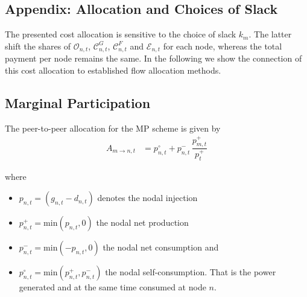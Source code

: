 \documentclass[11pt]{article}
\newcommand{\generation}[1][n]{g_{#1,s,t}}
\newcommand{\generationshare}[1][n]{\omega_{#1,s,t}}
\newcommand{\generationnodal}[1][n]{g_{#1,t}}
\newcommand{\demand}[1][n]{d_{#1,a,t}}
\newcommand{\demandnodal}[1][n]{d_{#1,t}}
\newcommand{\demandshare}[1][n]{\omega_{#1,a,t}}
\newcommand{\slack}[1][n]{k_{#1}}
\newcommand{\injection}{p_{n,t}}
\newcommand{\netconsumption}[1][n]{p^{-}_{#1,t}}
\newcommand{\netproduction}[1][n]{p^{+}_{#1,t}}
\newcommand{\selfconsumption}[1][n]{p^{\circ}_{#1,t}}
\newcommand{\totalnetproduction}{p^{+}_{t}}
\newcommand{\allocatePeer}[1][m \rightarrow n]{A_{#1,t}}
\newcommand{\allocateCapexGeneration}[1][n]{\mathcal{C}^{G}_{#1,t}}
\newcommand{\allocateCapexFlow}[1][n]{\mathcal{C}^{F}_{#1,t}}
\newcommand{\allocateOpex}[1][n]{\mathcal{O}_{#1,t}}
\newcommand{\allocateEmissionCost}[1][n]{\mathcal{E}_{#1,t}}
\begin{document}
% 
% 

\newpage
\subsection*{Appendix: Allocation and Choices of Slack}

The presented cost allocation is sensitive to the choice of slack $\slack[m]$. The latter shift the shares of $\allocateOpex$, $\allocateCapexGeneration$, $\allocateCapexFlow$ and $\allocateEmissionCost$ for each node, whereas the total payment per node remains the same. In the following we show the connection of this cost allocation to established flow allocation methods. \\

\subsection*{Marginal Participation}


The peer-to-peer allocation for the MP scheme is given by 
\begin{align}
\allocatePeer &= \selfconsumption + \netconsumption  \, \dfrac{\netproduction[m]}{\totalnetproduction}
\end{align}

where 
\begin{itemize}
 \item $\injection = \left( \generationnodal - \demandnodal \right) $ denotes the nodal injection
 \item $\netproduction = \text{min}\left( \injection, 0 \right) $ the nodal net production 
 \item $\netconsumption = \text{min}\left( - \injection, 0 \right)$ the nodal net consumption and
 \item $\selfconsumption = \text{min}\left( \netproduction, \netconsumption \right)$ the nodal self-consumption. That is the power generated and at the same time consumed at node $n$. 
\end{itemize}
\end{document}
